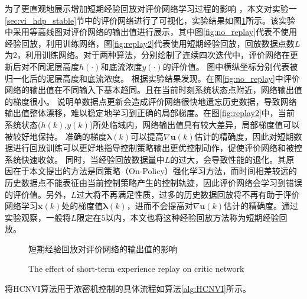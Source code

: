 为了更直观地展示增加短期经验回放对评价网络学习过程的影响
，本文对实验一\ref{sec:vi_hdp_stable}节中的评价网络进行了可视化，实验结果如图\ref{fig:replay_compare}所示。该实验中采用等高线图对评价网络的输出值进行展示，其中图\ref{fig:no_replay}代表不使用经验回放，利用训练网络，图\ref{fig:replay2}代表使用短期经验回放，回放数据点数$L$为2，利用训练网络。对于两种算法，分别绘制了连续四次迭代中，评价网络在更新后对不同泥层高度$h(\cdot)$和底流浓度$y(\cdot)$的评价值。
图中横纵坐标分别代表被归一化后的泥层高度和底流浓度。
根据实验结果发现。在图\ref{fig:no_replay}中评价网络的输出值在不同输入下基本趋同。且在当前时刻系统状态点附近，网络输出值的梯度很小。
说明单数据点更新会造成评价网络很快地遗忘历史数据，导致网络输出值整体漂移，难以稳定地学习到正确的局部梯度。在图\ref{fig:replay2}中，当前系统状态($h(k)$,$y(k)$)所处临域内，网络输出值具有较大差异，局部梯度值可以被较好地保持。
准确的梯度$\pmb \lambda(k)$可以提高$\nabla \pmb
u(k)$估计的精确度，因此对短期数据进行回放训练可以更好地指导控制策略输出更优控制动作，促使评价网络和被控系统快速收敛。
同时，当经验回放数据量中$L$的过大，会导致性能的退化。其原因在于本文提出的方法是同策略（On-Policy）强化学习方法，而时间相差较远的历史数据点不能表征由当前控制策略产生的控制轨迹，因此评价网络会学习到错误的评价值。另外，$L$过大将不再满足性质，过多的历史数据回放将不再有助于评价网络学习$\pmb
x(k)$处的梯度值$\pmb \lambda(k)$，进而不会提高对$\nabla \pmb
u(k)$估计的精确度。通过实验观察，一般将$L$限定在$5$以内，本文也将这种经验回放方法称为短期经验回放。

\begin{figure}[!ht]
\centering \subfigure{\label{fig:no_replay}}
\addtocounter{subfigure}{-2} 
\subfigure{\label{fig:replay2}} \addtocounter{subfigure}{-2}

%
\caption{短期经验回放对评价网络的输出值的影响 }
  \addtocounter{figure}{-1}
  \vspace{-5pt}
  \renewcommand{\figurename}{Fig.}
  \caption{The effect of short-term experience replay on critic network}
  \renewcommand{\figurename}{图}
\label{fig:replay_compare}
\end{figure}

将HCNVI算法用于浓密机控制的具体流程如算法\ref{alg:HCNVI}所示。


